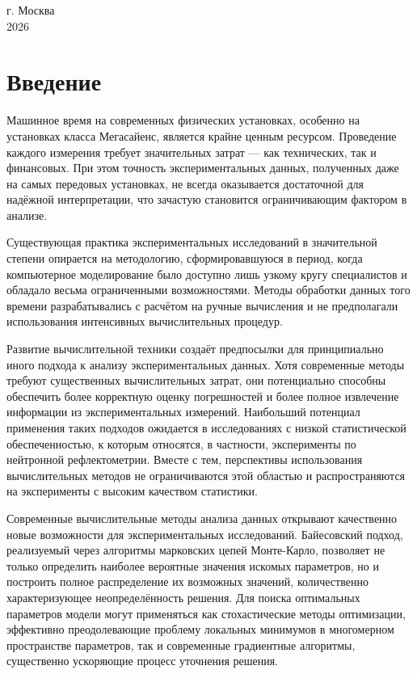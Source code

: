 \documentclass[a4paper]{article}
\begin{document}
\vfill

\begin{center}


г. Москва \\[0.5em]
2026\\[4em]
\end{center}

\author{}
\date{}

\tableofcontents
\section{Введение}
Машинное время на современных физических установках, особенно на установках класса Мегасайенс, является крайне ценным ресурсом. Проведение каждого измерения требует значительных затрат — как технических, так и финансовых. При этом точность экспериментальных данных, полученных даже на самых передовых установках, не всегда оказывается достаточной для надёжной интерпретации, что зачастую становится ограничивающим фактором в анализе.

Существующая практика экспериментальных исследований в значительной степени опирается на методологию, сформировавшуюся в период, когда компьютерное моделирование было доступно лишь узкому кругу специалистов и обладало весьма ограниченными возможностями. Методы обработки данных того времени разрабатывались с расчётом на ручные вычисления и не предполагали использования интенсивных вычислительных процедур.

Развитие вычислительной техники создаёт предпосылки для принципиально иного подхода к анализу экспериментальных данных. Хотя современные методы требуют существенных вычислительных затрат, они потенциально способны обеспечить более корректную оценку погрешностей и более полное извлечение информации из экспериментальных измерений. Наибольший потенциал применения таких подходов ожидается в исследованиях с низкой статистической обеспеченностью, к которым относятся, в частности, эксперименты по нейтронной рефлектометрии. Вместе с тем, перспективы использования вычислительных методов не ограничиваются этой областью и распространяются на эксперименты с высоким качеством статистики.

Современные вычислительные методы анализа данных открывают качественно новые возможности для экспериментальных исследований. Байесовский подход, реализуемый через алгоритмы марковских цепей Монте-Карло, позволяет не только определить наиболее вероятные значения искомых параметров, но и построить полное распределение их возможных значений, количественно характеризующее неопределённость решения. Для поиска оптимальных параметров модели могут применяться как стохастические методы оптимизации, эффективно преодолевающие проблему локальных минимумов в многомерном пространстве параметров, так и современные градиентные алгоритмы, существенно ускоряющие процесс уточнения решения.
\end{document}
